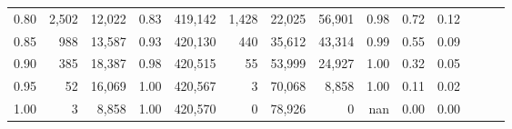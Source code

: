 \begin{tabular}{rrrrrrrrrrrrrr}
0.80 &   2,502 &  12,022 &  0.83 &  419,142 &    1,428 &  22,025 &  56,901 &  0.98 &  0.72 &      0.12 \\
0.85 &     988 &  13,587 &  0.93 &  420,130 &      440 &  35,612 &  43,314 &  0.99 &  0.55 &      0.09 \\
0.90 &     385 &  18,387 &  0.98 &  420,515 &       55 &  53,999 &  24,927 &  1.00 &  0.32 &      0.05 \\
0.95 &      52 &  16,069 &  1.00 &  420,567 &        3 &  70,068 &   8,858 &  1.00 &  0.11 &      0.02 \\
1.00 &       3 &   8,858 &  1.00 &  420,570 &        0 &  78,926 &       0 &   nan &  0.00 &      0.00 \\
\bottomrule
\end{tabular}
